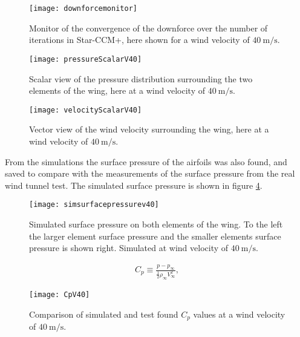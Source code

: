   \begin{figure}
    \texttt{[image: downforcemonitor]}
    \caption{Monitor of the convergence of the downforce over the number of iterations in Star-CCM+, here shown for a wind velocity of $\SI{40}{\metre\per\second}$.}
    \label{fig:downforcemonitor}
  \end{figure}

  \begin{figure}
    \texttt{[image: pressureScalarV40]}
    \caption{Scalar view of the pressure distribution surrounding the two elements of the wing, here at a wind velocity of $\SI{40}{\metre\per\second}$.}
    \label{fig:pressureScalarV40}
  \end{figure}

  \begin{figure}
    \texttt{[image: velocityScalarV40]}
    \caption{Vector view of the wind velocity surrounding the wing, here at a wind velocity of $\SI{40}{\metre\per\second}$.}
    \label{fig:velocityScalarV40}
  \end{figure}

  From the simulations the surface pressure of the airfoils was also found, and saved to compare with the measurements of the surface pressure from the real wind tunnel test. The simulated surface pressure is shown in figure \ref{fig:simsurfacepressurev40}.

  \begin{figure}
    \texttt{[image: simsurfacepressurev40]}
    \caption{Simulated surface pressure on both elements of the wing. To the left the larger element surface pressure and the smaller elements surface pressure is shown right. Simulated at wind velocity of $\SI{40}{\metre\per\second}$.}
    \label{fig:simsurfacepressurev40}
  \end{figure}



  \begin{align}
    C_p \equiv \frac{p-p_{\infty}}{\frac{1}{2}\rho_{\infty}V_{\infty}^2},
  \end{align}



  \begin{figure}
    \texttt{[image: CpV40]}
    \caption{Comparison of simulated and test found $C_p$ values at a wind velocity of $\SI{40}{\metre\per\second}$.}
    \label{fig:CpV40}
  \end{figure}

